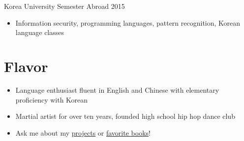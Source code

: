 \documentclass[line,margin]{res}
\begin{document}
\begin{resume}
    \vspace{-8pt}
    Korea University Semester Abroad \hfill 2015 \\
    \vspace{-12pt}
        \begin{itemize} \itemsep -2pt
        \item Information security, programming languages, pattern recognition, Korean language classes
        \end{itemize}

\vspace{-8pt}
\section{Flavor} 
    \vspace{22pt}
        \begin{itemize} \itemsep -2pt
        \item Language enthusiast fluent in English and Chinese with elementary proficiency with Korean
        \item Martial artist for over ten years, founded high school hip hop dance club
        \item Ask me about my \href{https://www.github.com/JDongian}{projects} or \href{https://www.goodreads.com/review/list/82392789}{favorite books}!
        \end{itemize}

\end{resume} 
\end{document}
